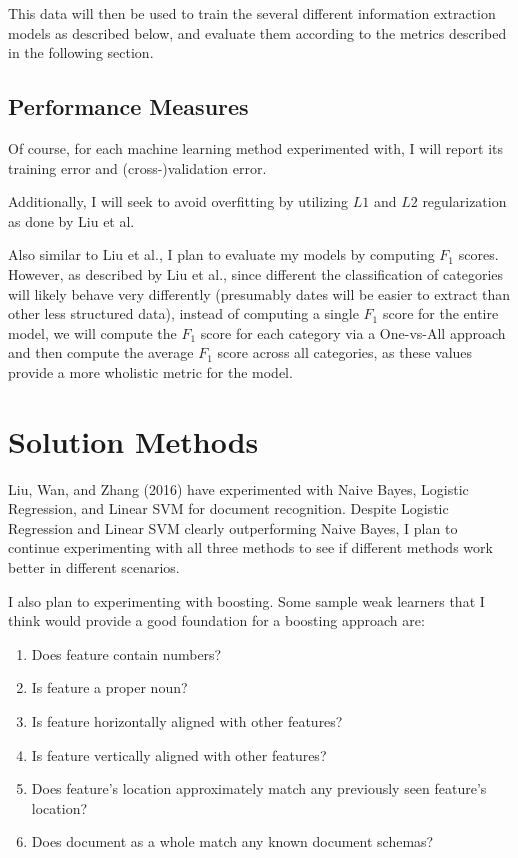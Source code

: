 \documentclass[twoside,10pt]{article}
\theoremstyle{definition}
\theoremstyle{definition}
\theoremstyle{remark}
\renewcommand{\>}{{\rightarrow}}
\newcommand{\1}{{\mathbf 1}}
\newcommand{\0}{{\mathbf 0}}
\begin{document}
This data will then be used to train the several different information extraction models as described below, and evaluate them according to the metrics described in the following section.

\subsection{Performance Measures}
Of course, for each machine learning method experimented with, I will report its training error and (cross-)validation error.

Additionally, I will seek to avoid overfitting by utilizing $L1$ and $L2$ regularization as done by Liu et al.

Also similar to Liu et al., I plan to evaluate my models by computing $F_1$ scores. However, as described by Liu et al., since different the classification of categories will likely behave very differently (presumably dates will be easier to extract than other less structured data), instead of computing a single $F_1$ score for the entire model, we will compute the $F_1$ score for each category via a One-vs-All approach and then compute the average $F_1$ score across all categories, as these values provide a more wholistic metric for the model.


\section{Solution Methods}
Liu, Wan, and Zhang (2016) have experimented with Naive Bayes, Logistic Regression, and Linear SVM for document recognition. Despite Logistic Regression and Linear SVM clearly outperforming Naive Bayes, I plan to continue experimenting with all three methods to see if different methods work better in different scenarios.

I also plan to experimenting with boosting. Some sample weak learners that I think would provide a good foundation for a boosting approach are:

\begin{enumerate}
    \item
    Does feature contain numbers?

    \item
    Is feature a proper noun?

    \item
    Is feature horizontally aligned with other features?

    \item
    Is feature vertically aligned with other features?

    \item
    Does feature's location approximately match any previously seen feature's location?

    \item
    Does document as a whole match any known document schemas?
\end{enumerate}
\end{document}

